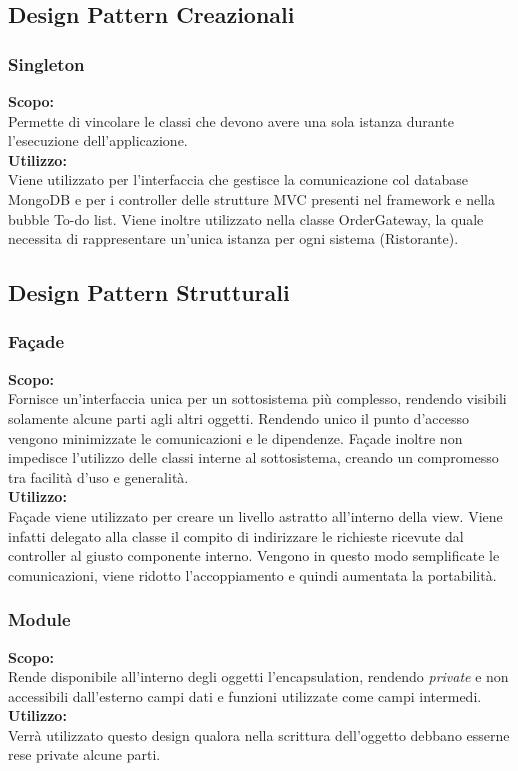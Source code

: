 \subsection{Design Pattern Creazionali}

\subsubsection{Singleton}
\textbf{Scopo:} \\
Permette di vincolare le classi che devono avere una sola istanza durante l'esecuzione dell'applicazione.\\
\textbf{Utilizzo:} \\
Viene utilizzato per l'interfaccia che gestisce la comunicazione col database MongoDB e per i controller delle strutture MVC presenti nel framework e nella bubble To-do list. Viene inoltre utilizzato nella classe Order\-Gateway, la quale necessita di rappresentare un'unica istanza per ogni sistema (Ristorante).

\subsection{Design Pattern Strutturali}

\subsubsection{Fa\c{c}ade}
\textbf{Scopo:} \\
Fornisce un'interfaccia unica per un sottosistema più complesso, rendendo visibili solamente alcune parti agli altri oggetti. Rendendo unico il punto d'accesso vengono minimizzate le comunicazioni e le dipendenze. Fa\c{c}ade inoltre non impedisce l'utilizzo delle classi interne al sottosistema, creando un compromesso tra facilità d'uso e generalità. \\
\textbf{Utilizzo:} \\ 
Fa\c{c}ade viene utilizzato per creare un livello astratto all'interno della view. Viene infatti delegato alla classe  il compito di indirizzare le richieste ricevute dal controller al giusto componente interno. Vengono in questo modo semplificate le comunicazioni, viene ridotto l'accoppiamento e quindi aumentata la portabilità. 

\subsubsection{Module}
\textbf{Scopo:} \\
Rende disponibile all'interno degli oggetti l'encapsulation, rendendo \textit{private} e non accessibili dall'esterno campi dati e funzioni utilizzate come campi intermedi.\\
\textbf{Utilizzo:} \\
Verrà utilizzato questo design qualora nella scrittura dell'oggetto debbano esserne rese private alcune parti.

